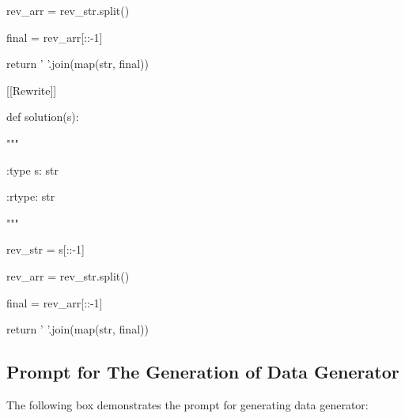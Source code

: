 {{\begin{minipage}{0.95\linewidth}
\qquad \qquad          rev\_arr = rev\_str.split()
         
\qquad \qquad          final = rev\_arr[::-1]

\qquad \qquad          return ' '.join(map(str, final))

[[Rewrite]]

def solution(s):

\qquad     """

\qquad     :type s: str

\qquad     :rtype: str

\qquad     """

\qquad     rev\_str = s[::-1]

\qquad     rev\_arr = rev\_str.split()

\qquad     final = rev\_arr[::-1]

\qquad     return ' '.join(map(str, final))
    
        \end{minipage}
    }
}

\subsection{Prompt for The Generation of Data Generator}
\label{sec:prompt_datagen}
The following box demonstrates the prompt for generating data generator:

